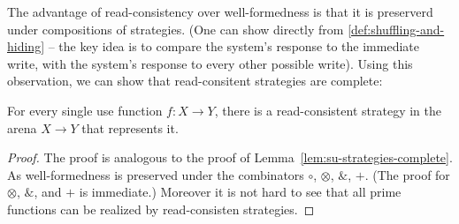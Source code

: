 The advantage of read-consistency over well-formedness is that it is preserverd under compositions of strategies. 
(One can show directly from \ref{def:shuffling-and-hiding} -- the key idea is to compare the system's response to the immediate write,
with the system's response to every other possible write). Using this observation, we can show that read-consitent strategies are complete:
\begin{lemma}\label{lem:all-read-consistent}
    For every single use function $f : X \to Y$, there is a read-consistent strategy in the arena $X \to Y$ that represents it. 
\end{lemma}
\begin{proof}
    The proof is analogous to the proof of Lemma~\ref{lem:su-strategies-complete}. As well-formedness is preserved
    under the combinators $\circ$, $\otimes$, $\&$, $+$. (The proof for $\otimes$, $\&$, and $+$ is immediate.)
    Moreover it is not hard to see that all prime functions can be realized by read-consisten strategies. 
\end{proof}

